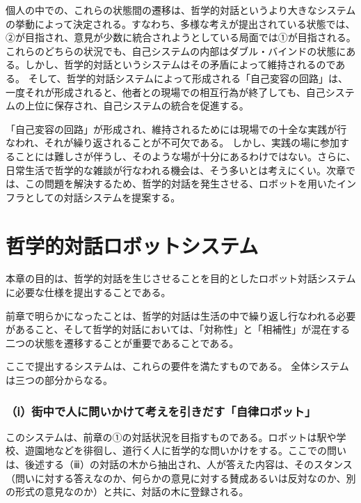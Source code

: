 \documentclass[b5j,twoside,twocolumn]{utarticle}
\begin{document}
個人の中での、これらの状態間の遷移は、哲学的対話というより大きなシステムの挙動によって決定される。すなわち、多様な考えが提出されている状態では、②が目指され、意見が少数に統合されようとしている局面では①が目指される。
これらのどちらの状況でも、自己システムの内部はダブル・バインドの状態にある。しかし、哲学的対話というシステムはその矛盾によって維持されるのである。
そして、哲学的対話システムによって形成される「自己変容の回路」は、一度それが形成されると、他者との現場での相互行為が終了しても、自己システムの上位に保存され、自己システムの統合を促進する。


「自己変容の回路」が形成され、維持されるためには現場での十全な実践が行なわれ、それが繰り返されることが不可欠である。
しかし、実践の場に参加することには難しさが伴うし、そのような場が十分にあるわけではない。さらに、日常生活で哲学的な雑談が行なわれる機会は、そう多いとは考えにくい。次章では、この問題を解決するため、哲学的対話を発生させる、ロボットを用いたインフラとしての対話システムを提案する。

\section{哲学的対話ロボットシステム}
本章の目的は、哲学的対話を生じさせることを目的としたロボット対話システムに必要な仕様を提出することである。





前章で明らかになったことは、哲学的対話は生活の中で繰り返し行なわれる必要があること、そして哲学的対話においては、「対称性」と「相補性」が混在する二つの状態を遷移することが重要であることである。


ここで提出するシステムは、これらの要件を満たすものである。
全体システムは三つの部分からなる。
\subsubsection*{（ⅰ）街中で人に問いかけて考えを引きだす「自律ロボット」}
このシステムは、前章の①の対話状況を目指すものである。ロボットは駅や学校、遊園地などを徘徊し、道行く人に哲学的な問いかけをする。ここでの問いは、後述する（ⅲ）の対話の木から抽出され、人が答えた内容は、そのスタンス（問いに対する答えなのか、何らかの意見に対する賛成あるいは反対なのか、別の形式の意見なのか）と共に、対話の木に登録される。
\end{document}
